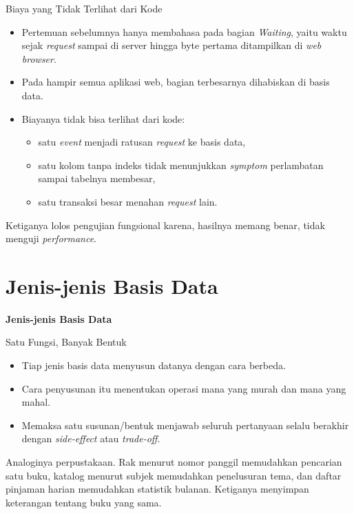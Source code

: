 \documentclass[aspectratio=169, table, 12pt]{beamer}
\begin{document}
\begin{frame}{{\Large Biaya yang Tidak Terlihat dari Kode}}
  \vspace{10pt}
  \begin{itemize}
    \item Pertemuan sebelumnya hanya membahasa pada bagian \emph{Waiting}, yaitu waktu sejak
          \textit{request} sampai di server hingga byte pertama ditampilkan di \textit{web browser}.
    \item Pada hampir semua aplikasi web, bagian terbesarnya dihabiskan di
          basis data.
    \item Biayanya tidak bisa terlihat dari kode:
    \begin{itemize}
      \item satu \textit{event} menjadi ratusan \textit{request} ke basis data, 
      \item satu kolom tanpa indeks tidak menunjukkan \textit{symptom} perlambatan sampai tabelnya membesar,
      \item satu transaksi besar menahan \textit{request} lain.
    \end{itemize}
  \end{itemize}
  \vspace{6pt}
  {\footnotesize Ketiganya lolos pengujian fungsional karena,  hasilnya memang
  benar, tidak menguji \textit{performance}.}
\end{frame}

\section{Jenis-jenis Basis Data}

\begin{frame}{\hfill}
  \centering
  \Huge{\textbf{Jenis-jenis Basis Data}}
\end{frame}

\begin{frame}{{\Large Satu Fungsi, Banyak Bentuk}}
  \vspace{10pt}
  \begin{itemize}
    \item Tiap jenis basis data menyusun datanya dengan cara berbeda.
    \item Cara penyusunan itu menentukan operasi mana yang murah dan mana
          yang mahal.
    \item Memaksa satu susunan/bentuk menjawab seluruh pertanyaan selalu berakhir
          dengan \textit{side-effect} atau \textit{trade-off}.
  \end{itemize}
  \vspace{10pt}
  {\footnotesize Analoginya perpustakaan. Rak menurut nomor panggil
  memudahkan pencarian satu buku, katalog menurut subjek memudahkan
  penelusuran tema, dan daftar pinjaman harian memudahkan statistik bulanan.
  Ketiganya menyimpan keterangan tentang buku yang sama.}
\end{frame}
\end{document}
